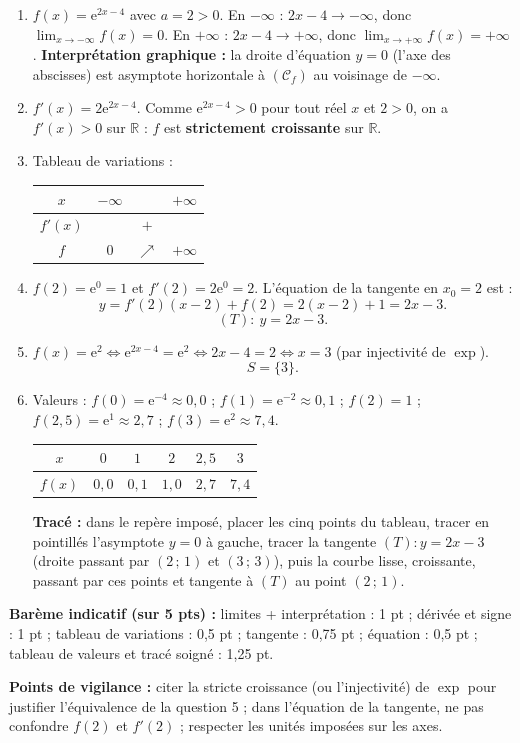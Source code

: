 \documentclass[11pt]{article}
\newcommand{\cle}[1]{{\popxbold\color{popdark}#1}}
\begin{document}
\begin{corrige}
\begin{enumerate}
\item $f(x)=\mathrm{e}^{2x-4}$ avec $a=2>0$.
En $-\infty$ : $2x-4\to -\infty$, donc $\displaystyle\lim_{x\to -\infty}f(x)=0$.
En $+\infty$ : $2x-4\to +\infty$, donc $\displaystyle\lim_{x\to +\infty}f(x)=+\infty$.
\textbf{Interprétation graphique :} la droite d'équation $y=0$ (l'axe des abscisses) est \cle{asymptote horizontale} à $(\mathcal{C}_{f})$ au voisinage de $-\infty$.
\item $f'(x)=2\mathrm{e}^{2x-4}$. Comme $\mathrm{e}^{2x-4}>0$ pour tout réel $x$ et $2>0$, on a $f'(x)>0$ sur $\mathbb{R}$ : $f$ est \textbf{strictement croissante} sur $\mathbb{R}$.
\item Tableau de variations :
\begin{center}
\begin{tabular}{|c|ccc|}
\hline $x$ & $-\infty$ & & $+\infty$ \\ \hline $f'(x)$ & & $+$ & \\ \hline $f$ & $0$ & $\nearrow$ & $+\infty$ \\ \hline
\end{tabular}
\end{center}
\item $f(2)=\mathrm{e}^{0}=1$ et $f'(2)=2\mathrm{e}^{0}=2$. L'équation de la tangente en $x_{0}=2$ est :
\[y=f'(2)(x-2)+f(2)=2(x-2)+1=2x-3.\]
\[(T):\ y=2x-3.\]
\item $f(x)=\mathrm{e}^{2}\iff \mathrm{e}^{2x-4}=\mathrm{e}^{2}\iff 2x-4=2\iff x=3$ (par injectivité de $\exp$).
\[S=\{3\}.\]
\item Valeurs : $f(0)=\mathrm{e}^{-4}\approx 0,0$ ; $f(1)=\mathrm{e}^{-2}\approx 0,1$ ; $f(2)=1$ ; $f(2{,}5)=\mathrm{e}^{1}\approx 2,7$ ; $f(3)=\mathrm{e}^{2}\approx 7,4$.
\begin{center}
\begin{tabular}{|c|ccccc|}
\hline $x$ & $0$ & $1$ & $2$ & $2{,}5$ & $3$ \\ \hline $f(x)$ & $0,0$ & $0,1$ & $1,0$ & $2,7$ & $7,4$ \\ \hline
\end{tabular}
\end{center}
\textbf{Tracé :} dans le repère imposé, placer les cinq points du tableau, tracer en pointillés l'asymptote $y=0$ à gauche, tracer la tangente $(T):y=2x-3$ (droite passant par $(2\,;\,1)$ et $(3\,;\,3)$), puis la courbe lisse, croissante, passant par ces points et tangente à $(T)$ au point $(2\,;\,1)$.
\end{enumerate}
\textbf{Barème indicatif (sur 5 pts) :} limites + interprétation : 1 pt ; dérivée et signe : 1 pt ; tableau de variations : 0,5 pt ; tangente : 0,75 pt ; équation : 0,5 pt ; tableau de valeurs et tracé soigné : 1,25 pt.

\textbf{Points de vigilance :} citer la stricte croissance (ou l'injectivité) de $\exp$ pour justifier l'équivalence de la question 5 ; dans l'équation de la tangente, ne pas confondre $f(2)$ et $f'(2)$ ; respecter les unités imposées sur les axes.
\end{corrige}
\end{document}
